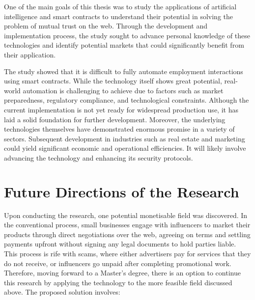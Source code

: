 One of the main goals of this thesis was to study the applications of artificial intelligence and smart contracts to understand their potential in solving the problem of mutual trust on the web. Through the development and implementation process, the study sought to advance personal knowledge of these technologies and identify potential markets that could significantly benefit from their application.

The study showed that it is difficult to fully automate employment interactions using smart contracts. While the technology itself shows great potential, real-world automation is challenging to achieve due to factors such as market preparedness, regulatory compliance, and technological constraints. Although the current implementation is not yet ready for widespread production use, it has laid a solid foundation for further development. Moreover, the underlying technologies themselves have demonstrated enormous promise in a variety of sectors. Subsequent development in industries such as real estate and marketing could yield significant economic and operational efficiencies. It will likely involve advancing the technology and enhancing its security protocols.

\section{Future Directions of the Research}

Upon conducting the research, one potential monetisable field was discovered. In the conventional process, small businesses engage with influencers to market their products through direct negotiations over the web, agreeing on terms and settling payments upfront without signing any legal documents to hold parties liable. This process is rife with scams, where either advertisers pay for services that they do not receive, or influencers go unpaid after completing promotional work. Therefore, moving forward to a Master's degree, there is an option to continue this research by applying the technology to the more feasible field discussed above. The proposed solution involves:

